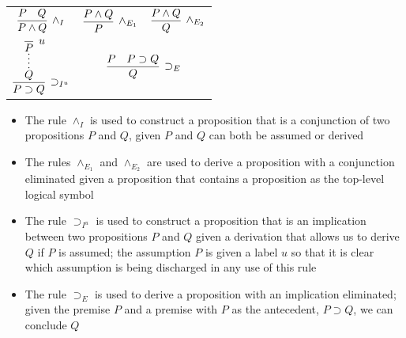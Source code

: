 \documentclass[12pt]{article}
\begin{document}
\setlength{\tabcolsep}{30pt}
\renewcommand\arraystretch{6}

\begin{center}
\begin{tabular}{c  c  c}
$\infer[\wedge_I]{P \wedge Q}{P & Q}$ &
$\infer[\wedge_{E_1}]{P}{P \wedge Q}$ &
$\infer[\wedge_{E_2}]{Q}{P \wedge Q}$ \\
$\infer[\supset_{I^u}]{P \supset Q}{\infer[u]{{\infer*{Q}{P}}}{}}$ &
\multicolumn{2}{c}{$\infer[\supset_E]{Q}{P & P \supset Q}$} \\
\end{tabular}
\end{center}

\begin{itemize}
	\item The rule $\wedge_I$ is used to construct a proposition that is a conjunction of two propositions $P$ and $Q$, given $P$ and $Q$ can both be assumed or derived
	\item The rules $\wedge_{E_1}$ and $\wedge_{E_2}$ are used to derive a proposition with a conjunction eliminated given a proposition that contains a proposition as the top-level logical symbol
	\item The rule $\supset_{I^u}$ is used to construct a proposition that is an implication between two propositions $P$ and $Q$ given a derivation that allows us to derive $Q$ if $P$ is assumed; the assumption $P$ is given a label $u$ so that it is clear which assumption is being discharged in any use of this rule
	\item The rule $\supset_E$ is used to derive a proposition with an implication eliminated; given the premise $P$ and a premise with $P$ as the antecedent, $P \supset Q$, we can conclude $Q$
\end{itemize}

{}

\end{document}
